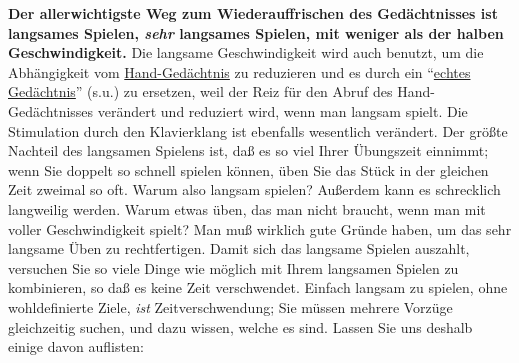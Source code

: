 \textbf{Der allerwichtigste Weg zum Wiederauffrischen des Gedächtnisses ist langsames Spielen, \textit{sehr} langsames Spielen, mit weniger als der halben Geschwindigkeit.}
Die langsame Geschwindigkeit wird auch benutzt, um die Abhängigkeit vom \hyperref[c1iii6d]{Hand-Gedächtnis} zu reduzieren und es durch ein \enquote{\hyperref[c1iii6tastatur]{echtes Gedächtnis}} (s.u.) zu ersetzen, weil der Reiz für den Abruf des Hand-Gedächtnisses verändert und reduziert wird, wenn man langsam spielt.
Die Stimulation durch den Klavierklang ist ebenfalls wesentlich verändert.
Der größte Nachteil des langsamen Spielens ist, daß es so viel Ihrer Übungszeit einnimmt; wenn Sie doppelt so schnell spielen können, üben Sie das Stück in der gleichen Zeit zweimal so oft.
Warum also langsam spielen?
Außerdem kann es schrecklich langweilig werden.
Warum etwas üben, das man nicht braucht, wenn man mit voller Geschwindigkeit spielt?
Man muß wirklich gute Gründe haben, um das sehr langsame Üben zu rechtfertigen.
Damit sich das langsame Spielen auszahlt, versuchen Sie so viele Dinge wie möglich mit Ihrem langsamen Spielen zu kombinieren, so daß es keine Zeit verschwendet.
Einfach langsam zu spielen, ohne wohldefinierte Ziele, \textit{ist} Zeitverschwendung; Sie müssen mehrere Vorzüge gleichzeitig suchen, und dazu wissen, welche es sind. Lassen Sie uns deshalb einige davon auflisten:

